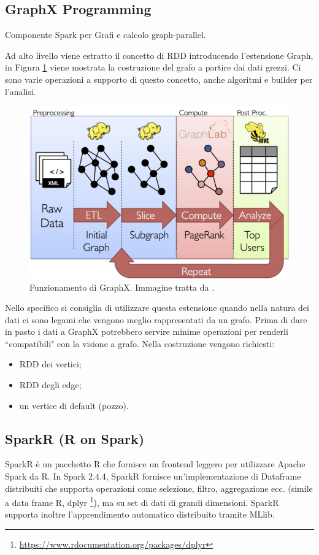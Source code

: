 \documentclass[12pt,italian]{article}
\begin{document}
\subsection{GraphX Programming}
Componente Spark per Grafi e calcolo graph-parallel.

Ad alto livello viene estratto il concetto di RDD introducendo l'estensione Graph, in Figura \ref{fig:GraphX} viene mostrata la costruzione del grafo a partire dai dati grezzi.
Ci sono varie operazioni a supporto di questo concetto, anche algoritmi e builder per l'analisi.
\begin{figure}[H]
	\centering 
	\includegraphics[width=0.8\linewidth]{img/graph_analytics_pipeline.png}
	\caption{Funzionamento di GraphX. Immagine tratta da \cite{spark}.}
	\label{fig:GraphX}
\end{figure}
Nello specifico si consiglia di utilizzare questa estensione quando nella natura dei dati ci sono legami che vengono meglio rappresentati da un grafo.
Prima di dare in pasto i dati a GraphX potrebbero servire minime operazioni per renderli ``compatibili" con la visione a grafo.
Nella costruzione vengono richiesti:
\begin{itemize}
	\item RDD dei vertici;
	\item RDD degli edge;
	\item un vertice di default (pozzo).
\end{itemize}
\subsection{SparkR (R on Spark)}
SparkR è un pacchetto R che fornisce un frontend leggero per utilizzare Apache Spark da R. In Spark 2.4.4, SparkR fornisce un'implementazione di Dataframe distribuiti che supporta operazioni come selezione, filtro, aggregazione ecc. (simile a data frame R, dplyr \footnote{\url{https://www.rdocumentation.org/packages/dplyr}}), ma su set di dati di grandi dimensioni. SparkR supporta inoltre l'apprendimento automatico distribuito tramite MLlib.
\end{document}
